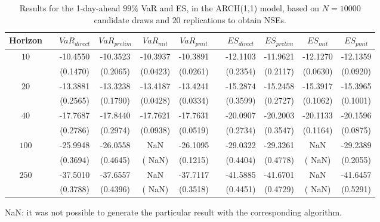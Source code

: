 \begin{table}[h] 
\centering 
\caption{Results for the 1-day-ahead $99\%$ VaR and ES, in the ARCH(1,1) model, based on $N=10000$ candidate draws and $20$ replications to obtain NSEs.} 
\label{tab:res_algos_arch} 
\begin{tabular}{ccccccccccc}  
 Horizon & & $VaR_{direct}$ & $VaR_{prelim}$ & $VaR_{mit}$  & $VaR_{pmit}$ &  & $ES_{direct}$ & $ES_{prelim}$ & $ES_{mit}$ & $ES_{pmit}$ \\ \hline 
$10$ & & -10.4550 & -10.3523 & -10.3937 & -10.3891 & & -12.1103 & -11.9621 & -12.1270 & -12.1359  \\ 
 & & (0.1470) & (0.2065) & (0.0423) & (0.0261) & & (0.2354) & (0.2117) & (0.0630) & (0.0920)   \\ [1ex] 
$20$ & & -13.3881 & -13.3238 & -13.4187 & -13.4241 & & -15.2874 & -15.2458 & -15.3917 & -15.3965  \\ 
 & & (0.2565) & (0.1790) & (0.0428) & (0.0334) & & (0.3599) & (0.2727) & (0.1062) & (0.1001)   \\ [1ex] 
$40$ & & -17.7687 & -17.8440 & -17.7621 & -17.7631 & & -20.0907 & -20.2003 & -20.1133 & -20.1596  \\ 
 & & (0.2786) & (0.2974) & (0.0938) & (0.0519) & & (0.2734) & (0.3547) & (0.1164) & (0.0875)   \\ [1ex] 
$100$ & & -25.9948 & -26.0558 &    NaN & -26.1095 & & -29.0322 & -29.3261 &    NaN & -29.2389  \\ 
 & & (0.3694) & (0.4645) & (   NaN) & (0.1215) & & (0.4404) & (0.4778) & (   NaN) & (0.2055)   \\ [1ex] 
$250$ & & -37.5010 & -37.6557 &    NaN & -37.7117 & & -41.5885 & -41.6701 &    NaN & -41.6457  \\ 
 & & (0.3788) & (0.4396) & (   NaN) & (0.3518) & & (0.4451) & (0.4729) & (   NaN) & (0.5291)   \\ [1ex] 
\hline 
\end{tabular} 
\raggedright 

\vspace{5pt}\footnotesize{NaN: it was not possible to generate the particular result with the corresponding algorithm.} 
\end{table} 
